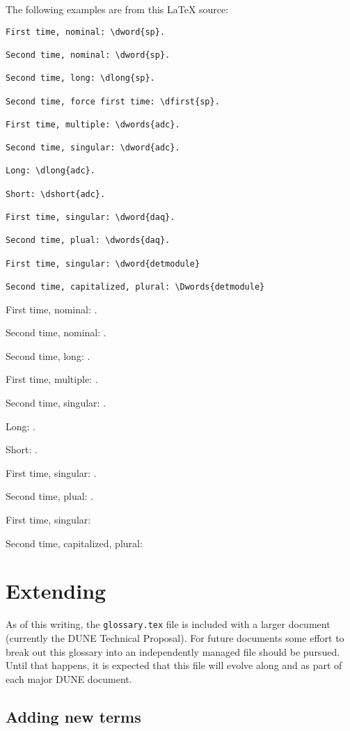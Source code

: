 \documentclass{article}
\begin{document}
The following examples are from this \LaTeX{} source:
\begin{verbatim}
First time, nominal: \dword{sp}.

Second time, nominal: \dword{sp}.

Second time, long: \dlong{sp}.

Second time, force first time: \dfirst{sp}.

First time, multiple: \dwords{adc}.

Second time, singular: \dword{adc}.

Long: \dlong{adc}.

Short: \dshort{adc}.

First time, singular: \dword{daq}.

Second time, plual: \dwords{daq}.

First time, singular: \dword{detmodule}

Second time, capitalized, plural: \Dwords{detmodule}
\end{verbatim}

First time, nominal: .

Second time, nominal: .

Second time, long: .

First time, multiple: .

Second time, singular: .

Long: .

Short: .

First time, singular: .

Second time, plual: .

First time, singular: 

Second time, capitalized, plural: 


\section{Extending}

As of this writing, the \texttt{glossary.tex} file is included with a
larger document (currently the DUNE Technical Proposal). 
For future documents some effort to break out this glossary into an
independently managed file should be pursued. 
Until that happens, it is expected that this file will evolve along
and as part of each major DUNE document.

\subsection{Adding new terms}
\end{document}
